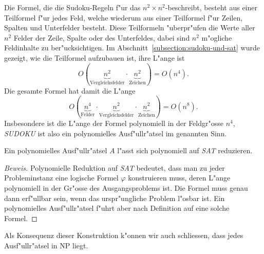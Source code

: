 \begin{beispiel}
Die Formel, die die Sudoku-Regeln f"ur das $n^2\times n^2$-beschreibt,
besteht aus einer 
Teilformel f"ur jedes Feld, welche wiederum aus einer Teilformel
f"ur Zeilen, Spalten und Unterfelder besteht.
Diese Teilformeln "uberpr"ufen die Werte aller $n^2$ Felder der Zeile,
Spalte oder des Unterfeldes, dabei sind $n^2$ m"ogliche Feldinhalte
zu ber"ucksichtigen.
Im Abschnitt~\ref{subsection:sudoku-und-sat} wurde gezeigt, wie die
Teilformel aufzubauen ist, ihre L"ange ist
\[
O(\underbrace{n^2}_{\text{Vergleichsfelder}}\cdot
\underbrace{n^2}_{\text{Zeichen}}) = O(n^4).
\]
Die gesamte Formel hat damit die L"ange
\[
O(\underbrace{n^4}_{\text{Felder}}\cdot
\underbrace{n^2}_{\text{Vergleichsfelder}}\cdot
\underbrace{n^2}_{\text{Zeichen}}) = O(n^8).
\]
Insbesondere ist die L"ange der Formel polynomiell in der Feldgr"osse $n^4$,
\textsl{SUDOKU}
ist also ein polynomielles Ausf"ullr"atsel im genannten Sinn.
\end{beispiel}

\begin{satz}
Ein polynomielles Ausf"ullr"atsel $A$ l"asst sich polynomiell auf 
\textsl{SAT} reduzieren.
\end{satz}

\begin{proof}[Beweis]
Polynomielle Reduktion auf \textsl{SAT} bedeutet, dass man zu jeder
Probleminstanz eine logische Formel $\varphi$ konstruieren muss,
deren L"ange polynomiell in der Gr"osse des Ausgangsproblems ist.
Die Formel muss genau dann erf"ullbar sein, wenn das urspr"ungliche
Problem l"osbar ist.
Ein polynomielles Ausf"ullr"atsel f"uhrt aber nach Definition auf
eine solche Formel.
\end{proof}

Als Konsequenz dieser Konstruktion k"onnen wir auch schliessen, dass
jedes Ausf"ullr"atsel in NP liegt.

